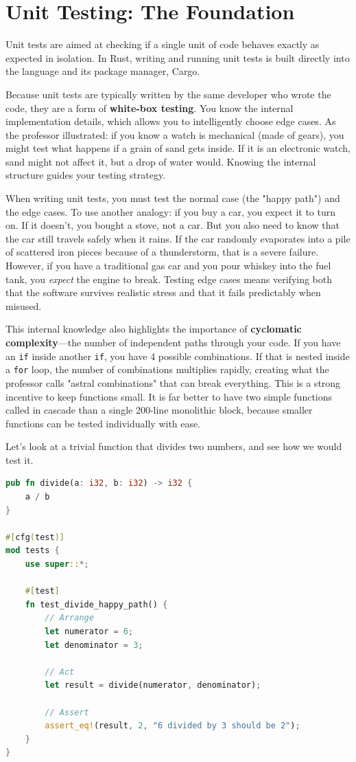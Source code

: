 \section{Unit Testing: The Foundation}

Unit tests are aimed at checking if a single unit of code behaves exactly as expected in isolation. In Rust, writing and running unit tests is built directly into the language and its package manager, Cargo.

Because unit tests are typically written by the same developer who wrote the code, they are a form of \textbf{white-box testing}. You know the internal implementation details, which allows you to intelligently choose edge cases. As the professor illustrated: if you know a watch is mechanical (made of gears), you might test what happens if a grain of sand gets inside. If it is an electronic watch, sand might not affect it, but a drop of water would. Knowing the internal structure guides your testing strategy.

When writing unit tests, you must test the normal case (the "happy path") and the edge cases. To use another analogy: if you buy a car, you expect it to turn on. If it doesn't, you bought a stove, not a car. But you also need to know that the car still travels safely when it rains. If the car randomly evaporates into a pile of scattered iron pieces because of a thunderstorm, that is a severe failure. However, if you have a traditional gas car and you pour whiskey into the fuel tank, you \textit{expect} the engine to break. Testing edge cases means verifying both that the software survives realistic stress and that it fails predictably when misused.

This internal knowledge also highlights the importance of \textbf{cyclomatic complexity}---the number of independent paths through your code. If you have an \texttt{if} inside another \texttt{if}, you have 4 possible combinations. If that is nested inside a \texttt{for} loop, the number of combinations multiplies rapidly, creating what the professor calls "astral combinations" that can break everything. This is a strong incentive to keep functions small. It is far better to have two simple functions called in cascade than a single 200-line monolithic block, because smaller functions can be tested individually with ease.

Let's look at a trivial function that divides two numbers, and see how we would test it.

\begin{lstlisting}[language=Rust]
pub fn divide(a: i32, b: i32) -> i32 {
    a / b
}

#[cfg(test)]
mod tests {
    use super::*;

    #[test]
    fn test_divide_happy_path() {
        // Arrange
        let numerator = 6;
        let denominator = 3;

        // Act
        let result = divide(numerator, denominator);

        // Assert
        assert_eq!(result, 2, "6 divided by 3 should be 2");
    }
}
\end{lstlisting}

